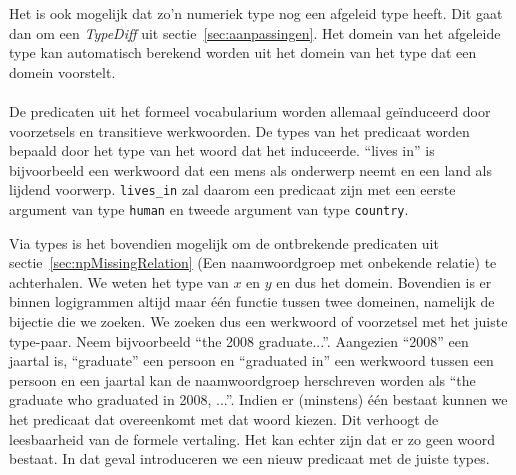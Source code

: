 Het is ook mogelijk dat zo'n numeriek type nog een afgeleid type heeft. Dit gaat dan om een \textit{TypeDiff} uit sectie~\ref{sec:aanpassingen}. Het domein van het afgeleide type kan automatisch berekend worden uit het domein van het type dat een domein voorstelt.

\paragraph{} De predicaten uit het formeel vocabularium worden allemaal geïnduceerd door voorzetsels en transitieve werkwoorden. De types van het predicaat worden bepaald door het type van het woord dat het induceerde. ``lives in'' is bijvoorbeeld een werkwoord dat een mens als onderwerp neemt en een land als lijdend voorwerp. \texttt{lives\_in} zal daarom een predicaat zijn met een eerste argument van type \texttt{human} en tweede argument van type \texttt{country}.

Via types is het bovendien mogelijk om de ontbrekende predicaten uit sectie~\ref{sec:npMissingRelation} (Een naamwoordgroep met onbekende relatie) te achterhalen. We weten het type van $x$ en $y$ en dus het domein. Bovendien is er binnen logigrammen altijd maar één functie tussen twee domeinen, namelijk de bijectie die we zoeken. We zoeken dus een werkwoord of voorzetsel met het juiste type-paar. Neem bijvoorbeeld ``the 2008 graduate...''. Aangezien ``2008'' een jaartal is, ``graduate'' een persoon en ``graduated in'' een werkwoord tussen een persoon en een jaartal kan de naamwoordgroep herschreven worden als ``the graduate who graduated in 2008, ...''.  Indien er (minstens) één bestaat kunnen we het predicaat dat overeenkomt met dat woord kiezen. Dit verhoogt de leesbaarheid van de formele vertaling. Het kan echter zijn dat er zo geen woord bestaat. In dat geval introduceren we een nieuw predicaat met de juiste types.

